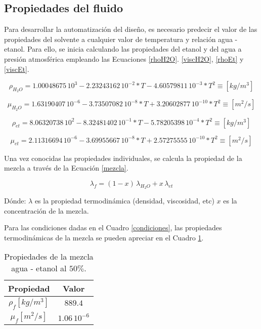 \subsection{Propiedades del fluido}

\noindent
\justify

Para desarrollar la automatizaci\'on del dise\~no, es necesario predecir el valor de las propiedades del solvente a cualquier valor de temperatura y relaci\'on agua - etanol. Para ello, se inicia calculando las propiedades del etanol y del agua a presi\'on atmosf\'erica empleando las Ecuaciones \ref{rhoH2O}. \ref{viscH2O}, \ref{rhoEt} y \ref{viscEt}.

\begin{equation}
	\rho _{H_2O} = 1.00048675 \, 10^3 - 2.23243162 \, 10^{-2}*T - 4.60579811 \, 10^{-3}*T^2 \equiv \left[ kg / m^3 \right] 
	\label{rhoH2O}
\end{equation}

\begin{equation}
	\mu _{H_2O} = 1.63190407 \, 10^{-6} - 3.73507082 \, 10^{-8}*T + 3.20602877 \, 10^{-10}*T^2 \equiv \left[ m^2 / s \right] 
	\label{viscH2O}
\end{equation}


\begin{equation}
	\rho _{et} = 8.06320738 \, 10^{2}-8.32481402 \, 10^{-1}*T-5.78205398 \, 10^{-4}*T^2 \equiv \left[ kg / m^3 \right] 
	\label{rhoEt}
\end{equation}

\begin{equation}
	\mu _{et} = 2.11316694 \, 10^{-6} - 3.69955667 \, 10^{-8}*T + 2.57275555 \, 10^{-10}*T^2 \equiv \left[ m^2 / s \right] 
	\label{viscEt}
\end{equation}

\noindent
\justify

Una vez conocidas las propiedades individuales, se calcula la propiedad de la mezcla a trav\'es de la Ecuaci\'on \ref{mezcla}.

\begin{equation}
	\lambda _f = (1-x) \, \lambda _{H_2O} + x \, \lambda _{et}
	\label{mezcla}
\end{equation}

\noindent
\justify

D\'onde: $\lambda$ es la propiedad termodin\'amica (densidad, viscosidad, etc) $x$ es la concentraci\'on de la mezcla.

\noindent
\justify

Para las condiciones dadas en el Cuadro \ref{condiciones}, las propiedades termodin\'amicas de la mezcla se pueden apreciar en el Cuadro \ref{temoM}.

\begin{table}[h!]
	\centering
	\begin{tabular}{|c|c|}
	\hline
	\textbf{Propiedad} & \textbf{Valor} \\ \hline
	$\rho _f \left[ kg / m^3 \right]$ & $889.4$ \\ \hline
	$\mu _f \left[ m^2 / s \right] $ & $1.06 \, 10^{-6}$ \\ \hline
	\end{tabular}
	\caption{Propiedades de la mezcla agua - etanol al $50 \%$.}
	\label{temoM}
\end{table}
